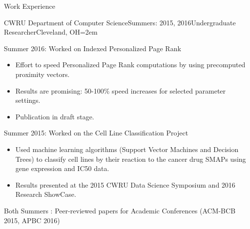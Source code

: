 \documentclass{resume} %
\begin{document}

\begin{rSection}{Work Experience}

\begin{rSubsection}{CWRU Department of Computer Science}{Summers: 2015, 2016}{Undergraduate Researcher}{Cleveland, OH}{\leftmargin=2em}

\item Summer 2016: Worked on Indexed Personalized Page Rank
{\renewcommand\labelitemi{$\cdot$}\vspace{-0.5em}
\begin{itemize}
\item Effort to speed Personalized Page Rank computations by using precomputed proximity vectors.
\vspace{-0.5em}  
\item Results are promising: 50-100\% speed increases for selected parameter settings.
\vspace{-0.5em}  
\item Publication in draft stage.
\end{itemize}
}

\item Summer 2015: Worked on the Cell Line Classification Project
{\renewcommand\labelitemi{$\cdot$}\vspace{-0.5em}
\begin{itemize}
\item Used machine learning algorithms (Support Vector Machines and Decision Trees) to classify cell lines by their reaction to the cancer drug SMAPs using gene expression and IC50 data.
\vspace{-0.5em}  
\item Results presented at the 2015 CWRU Data Science Symposium and 2016 Research ShowCase.
\end{itemize}
}
\item Both Summers : Peer-reviewed papers for Academic Conferences (ACM-BCB 2015, APBC 2016)
\end{rSubsection}



\end{rSection}
\end{document}
